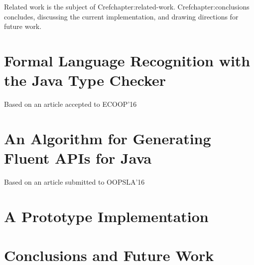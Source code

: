 \documentclass[12pt]{book}
\begin{document}
Related work is the subject of Cref{chapter:related-work}.
Cref{chapter:conclusions}
concludes, discussing the current implementation, and drawing
directions for future
work.

\chapter{Formal Language Recognition with the Java Type Checker}
\Large Based on an article accepted to ECOOP'16~\cite{Gil:Levy:2016}
\label{chapter:ecoop}
\normalsize


\chapter{An Algorithm for Generating Fluent APIs for Java}
\Large Based on an article submitted to OOPSLA'16~\cite{Gil:Levy:2016a}
\label{chapter:oopsla}
\normalsize


\chapter{A Prototype Implementation}
\label{chapter:tokens}
%

\chapter{Conclusions and Future Work}
\label{chapter:conclusions}





\end{document}
